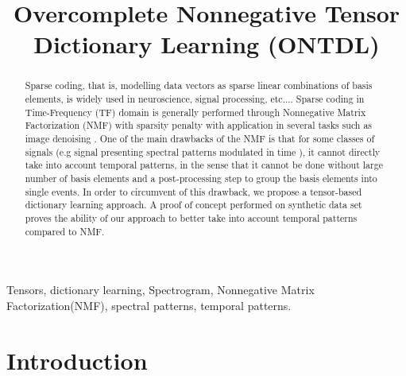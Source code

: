 \documentclass{article}
\title{Overcomplete Nonnegative Tensor Dictionary Learning (ONTDL) }
\begin{document}
 \maketitle
 \begin{abstract}
 Sparse coding, that is, modelling data vectors as sparse linear combinations of basis elements, is widely used in neuroscience, signal processing, etc.... Sparse coding in Time-Frequency (TF) domain is generally performed through Nonnegative Matrix Factorization (NMF) with  sparsity penalty with application in several tasks such as image denoising \cite{refDictionaryImagedenoising}. 
 One of the main drawbacks of the NMF is that for some classes of signals (e.g signal presenting spectral patterns modulated in time ), it  cannot directly take into account temporal patterns, in the sense that it cannot be done  without large number of basis elements and a post-processing step to group the basis elements into single events. In order to circumvent of this drawback, we propose a tensor-based dictionary learning approach. A proof of concept performed on synthetic data set proves the ability of our approach to better take into account temporal patterns compared to NMF.
 \end{abstract}
 \begin{keywords}
Tensors, dictionary learning, Spectrogram, Nonnegative Matrix Factorization(NMF), spectral patterns, temporal patterns.
 \end{keywords}
 \section{Introduction}
 \label{sec:intro} 
 



\end{document}
